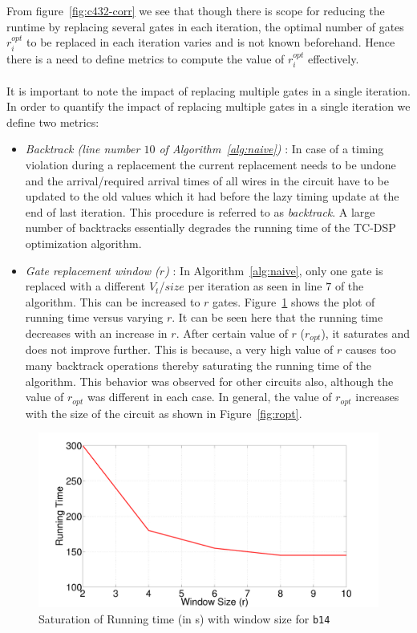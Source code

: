 \noindent From figure~\ref{fig:c432-corr} we see that though there is scope for reducing the runtime by replacing several gates in each iteration, the optimal number of gates $r_{i}^{opt}$ to be replaced in each iteration varies and is not known beforehand. Hence there is a need to define metrics to compute the value of $r_{i}^{opt}$ effectively.\\
 \\
It is important to note the impact of replacing multiple gates in a single iteration. In order to quantify the impact of replacing multiple gates in a single iteration we define two metrics:

\begin{itemize}
    \item {\it Backtrack (line number $10$ of Algorithm~\ref{alg:naive}) }: In case of a timing violation during a replacement the current replacement needs to be undone and the arrival/required arrival times of all wires in the circuit have to be updated to the old values which it had before the lazy timing update at the end of last iteration. This procedure is referred to as \textit{backtrack}. A large number of backtracks essentially degrades the running time of the TC-DSP optimization algorithm. 

    \item {\it Gate replacement window ($r$) }: In Algorithm~\ref{alg:naive}, only one gate is replaced  with a different $V_t$/$size$ per iteration as seen in line $7$ of the algorithm. This can be increased to $r$ gates. Figure~\ref{fig:saturation-of-running-time} shows the plot of running time versus varying $r$. 
It can be seen here that the running time decreases with an increase in $r$. 
After certain value of $r$ ($r_{opt}$), it saturates and does not improve further. 
        This is because, a very high value of $r$ causes too many backtrack operations thereby saturating the running time of the algorithm. This behavior was observed for other circuits also, although the value of $r_{opt}$ was different 
in each case. In general, the value of $r_{opt}$ increases with the size of the circuit as shown 
in Figure~\ref{fig:ropt}. 
\end{itemize}
\begin{figure}[t]
\begin{center}
\includegraphics[scale=0.2]{Chapter3/fig/b14_running_time_vs_window_size.pdf}
\end{center}
\caption{Saturation of Running time (in s) with window size for \texttt{b14}}
\label{fig:saturation-of-running-time}
\end{figure}
